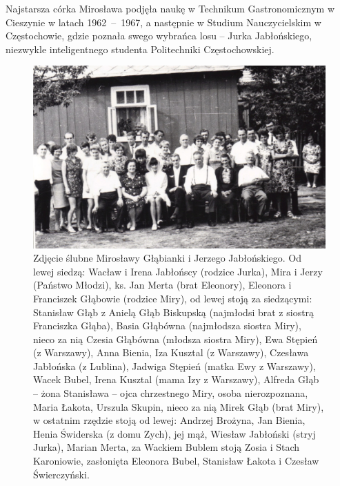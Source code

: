 Najstarsza córka Mirosława podjęła naukę w Technikum Gastronomicznym w Cieszynie w latach 1962~--~1967, a następnie w Studium Nauczycielskim w Częstochowie, gdzie poznała swego wybrańca losu -- Jurka Jabłońskiego, niezwykle inteligentnego studenta Politechniki Częstochowskiej.

\begin{figure}[!hb]
\begin{center}
\includegraphics[width=\textwidth]{zdjecia/slub_jerzego_i_miroslawy_jablonskich_zbiorowe.jpg}
\caption[Zbiorowe zdjęcie ślubne Mirosławy i Jerzego Jabłońskich]{Zdjęcie ślubne Mirosławy Głąbianki i Jerzego Jabłońskiego. Od lewej siedzą: Wacław i Irena Jabłońscy (rodzice Jurka), Mira i Jerzy (Państwo Młodzi), ks. Jan Merta (brat Eleonory), Eleonora i Franciszek Głąbowie (rodzice Miry), od lewej stoją za siedzącymi: Stanisław Głąb z Anielą Głąb Biskupską (najmłodsi brat z siostrą Franciszka Głąba), Basia Głąbówna (najmłodsza siostra Miry), nieco za nią Czesia Głąbówna (młodsza siostra Miry), Ewa Stępień (z Warszawy), Anna Bienia, Iza Kusztal (z Warszawy), Czesława Jabłońska (z Lublina), Jadwiga Stępień (matka Ewy z Warszawy), Wacek Bubel, Irena Kusztal (mama Izy z Warszawy), Alfreda Głąb -- żona Stanisława -- ojca chrzestnego Miry, osoba nierozpoznana, Maria Łakota, Urszula Skupin, nieco za nią Mirek Głąb (brat Miry), w ostatnim rzędzie stoją od lewej: Andrzej Brożyna, Jan Bienia, Henia Świderska (z domu Zych), jej mąż, Wiesław Jabłoński (stryj Jurka), Marian Merta, za Wackiem Bublem stoją Zosia i Stach Karoniowie, zasłonięta Eleonora Bubel, Stanisław Łakota i Czesław Świerczyński.}
\label{rys:slub_jerzego_i_miroslawy_jablonskich_zbiorowe}
\end{center}
\end{figure}

